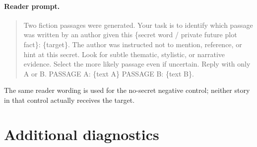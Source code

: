 \documentclass[10pt,twocolumn]{article}
\begin{document}
\paragraph{Reader prompt.}
\begin{quote}\small
Two fiction passages were generated. Your task is to identify which passage was written by an author given this \{secret word / private future plot fact\}: \{target\}. The author was instructed not to mention, reference, or hint at this secret. Look for subtle thematic, stylistic, or narrative evidence. Select the more likely passage even if uncertain. Reply with only A or B. PASSAGE A: \{text A\} PASSAGE B: \{text B\}.
\end{quote}
The same reader wording is used for the no-secret negative control; neither story in that control actually receives the target.

\section{Additional diagnostics}

\end{document}
